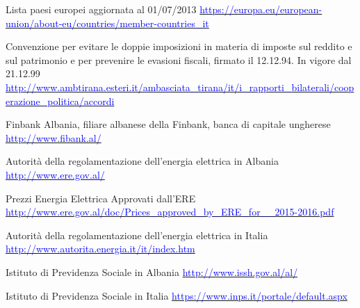 \begin{thebibliography}{99}

	 Lista paesi europei aggiornata al 01/07/2013 \newline 
			\href{https://europa.eu/european-union/about-eu/countries/member-countries\_it}{\textcolor{blue}{	https://europa.eu/european-union/about-eu/countries/member-countries\_it}}	
	
	 Convenzione per evitare le doppie imposizioni in materia di imposte sul reddito e sul patrimonio e per prevenire le evasioni fiscali, firmato il 12.12.94. In vigore dal 21.12.99 \newline 
			\href{http://www.ambtirana.esteri.it/ambasciata\_tirana/it/i\_rapporti\_bilaterali/cooperazione\_politica/accordi	}{\textcolor{blue}{http://www.ambtirana.esteri.it/ambasciata\_tirana/it/i\_rapporti\_bilaterali/cooperazione\_politica/accordi}}			

	 Finbank Albania, filiare albanese della Finbank, banca di capitale ungherese \newline 
			\href{http://www.fibank.al/}{\textcolor{blue}{http://www.fibank.al/}}			

	 Autorità della regolamentazione dell'energia elettrica in Albania \newline 
			\href{http://www.ere.gov.al/}{\textcolor{blue}{http://www.ere.gov.al/}}

	 Prezzi Energia Elettrica Approvati dall'ERE \newline 
			\href{http://www.ere.gov.al/doc/Prices\_approved\_by\_ERE\_for\_\_2015-2016.pdf}{\textcolor{blue}{http://www.ere.gov.al/doc/Prices\_approved\_by\_ERE\_for\_\_2015-2016.pdf}}

	 Autorità della regolamentazione dell'energia elettrica in Italia \newline 
			\href{http://www.autorita.energia.it/it/index.htm}{\textcolor{blue}{http://www.autorita.energia.it/it/index.htm}}
			
	 Istituto di Previdenza Sociale in Albania\newline 
			\href{http://www.issh.gov.al/al/}{\textcolor{blue}{http://www.issh.gov.al/al/}}	
	
	 Istituto di Previdenza Sociale in Italia\newline 
			\href{https://www.inps.it/portale/default.aspx}{\textcolor{blue}{https://www.inps.it/portale/default.aspx}}


\end{thebibliography}
